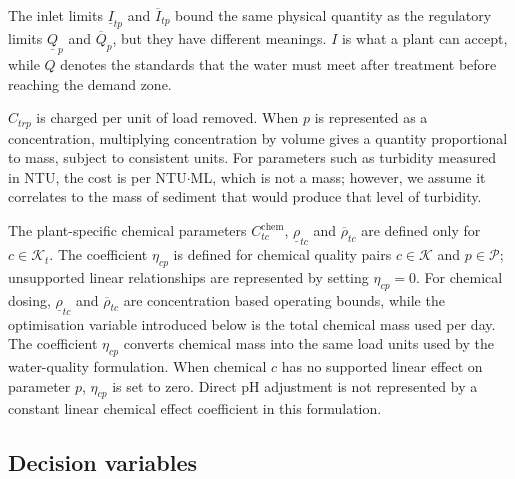 \documentclass[10pt]{article}
\begin{document}
The inlet limits $\underline{I}_{tp}$ and $\overline{I}_{tp}$ bound the same physical quantity as the regulatory limits $\underline{Q}_{p}$ and $\overline{Q}_{p}$, but they have different meanings.
$I$ is what a plant can accept, while $Q$ denotes the standards that the water must meet after treatment before reaching the demand zone.

$C_{trp}$ is charged per unit of load removed.
When $p$ is represented as a concentration, multiplying concentration by volume gives a quantity proportional to mass, subject to consistent units.
For parameters such as turbidity measured in NTU, the cost is per NTU$\cdot$ML, which is not a mass; however, we assume it correlates to the mass of sediment that would produce that level of turbidity.

The plant-specific chemical parameters $C^{\mathrm{chem}}_{tc}$, $\underline{\rho}_{tc}$ and $\overline{\rho}_{tc}$ are defined only for $c \in \mathcal{K}_t$.
The coefficient $\eta_{cp}$ is defined for chemical quality pairs $c \in \mathcal{K}$ and $p \in \mathcal{P}$; unsupported linear relationships are represented by setting $\eta_{cp}=0$.
For chemical dosing, $\underline{\rho}_{tc}$ and $\overline{\rho}_{tc}$ are concentration based operating bounds, while the optimisation variable introduced below is the total chemical mass used per day.
The coefficient $\eta_{cp}$ converts chemical mass into the same load units used by the water-quality formulation.
When chemical $c$ has no supported linear effect on parameter $p$, $\eta_{cp}$ is set to zero.
Direct pH adjustment is not represented by a constant linear chemical effect coefficient in this formulation.

\subsection{Decision variables}
\end{document}
